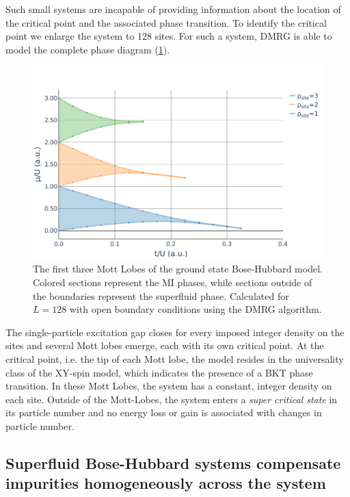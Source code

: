 \documentclass[twoside,twocolumn,9pt]{article}
\begin{document}
Such small systems are incapable of providing information about the location of the critical point and the associated phase transition. To identify the critical point we enlarge the system to 128 sites. For such a system, DMRG is able to model the complete phase diagram (\cref{fig:Mott-Lobes}).
\begin{center}
  \begin{figure}
      \includegraphics[width=\linewidth]{../code/figures/Mott-Lobes.pdf}
      \caption{The first three Mott Lobes of the ground state Bose-Hubbard model. Colored sections represent the MI phases, while sections outside of the boundaries represent the superfluid phase. Calculated for $L=128$ with open boundary conditions using the DMRG algorithm.}
      \label{fig:Mott-Lobes}
  \end{figure}
\end{center}
The single-particle excitation gap closes for every imposed integer density on the sites and several Mott lobes emerge, each with its own critical point. At the critical point, i.e. the tip of each Mott lobe, the model resides in the universality class of the XY-spin model, which indicates the presence of a BKT phase transition. In these Mott Lobes, the system has a constant, integer density on each site. Outside of the Mott-Lobes, the system enters a \emph{super critical state} in its particle number and no energy loss or gain is associated with changes in particle number.

\subsection{Superfluid Bose-Hubbard systems compensate impurities homogeneously across the system}
\end{document}
